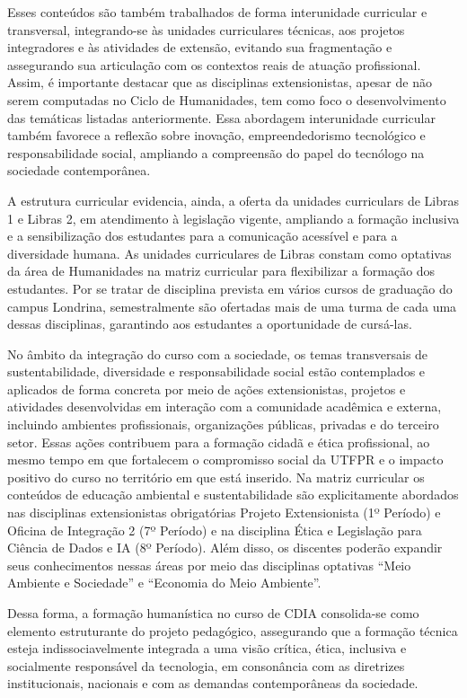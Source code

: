 Esses conteúdos são também trabalhados de forma interunidade curricular e transversal, integrando-se às unidades curriculares técnicas, aos projetos integradores e às atividades de extensão, evitando sua fragmentação e assegurando sua articulação com os contextos reais de atuação profissional. Assim, é importante destacar que as disciplinas extensionistas, apesar de não serem computadas no Ciclo de Humanidades, tem como foco o desenvolvimento das temáticas listadas anteriormente. Essa abordagem interunidade curricular também favorece a reflexão sobre inovação, empreendedorismo tecnológico e responsabilidade social, ampliando a compreensão do papel do tecnólogo na sociedade contemporânea.

A estrutura curricular evidencia, ainda, a oferta da unidades curriculars de Libras 1 e Libras 2, em atendimento à legislação vigente, ampliando a formação inclusiva e a sensibilização dos estudantes para a comunicação acessível e para a diversidade humana. As unidades curriculares de Libras constam como optativas da área de Humanidades na matriz curricular para flexibilizar a formação dos estudantes. Por se tratar de disciplina prevista em vários cursos de graduação do campus Londrina, semestralmente são ofertadas mais de uma turma de cada uma dessas disciplinas, garantindo aos estudantes a oportunidade de cursá-las.

No âmbito da integração do curso com a sociedade, os temas transversais de sustentabilidade, diversidade e responsabilidade social estão contemplados e aplicados de forma concreta por meio de ações extensionistas, projetos e atividades desenvolvidas em interação com a comunidade acadêmica e externa, incluindo ambientes profissionais, organizações públicas, privadas e do terceiro setor. Essas ações contribuem para a formação cidadã e ética profissional, ao mesmo tempo em que fortalecem o compromisso social da UTFPR e o impacto positivo do curso no território em que está inserido. Na matriz curricular os conteúdos de educação ambiental e sustentabilidade são explicitamente abordados nas disciplinas extensionistas obrigatórias Projeto Extensionista (1º Período) e Oficina de Integração 2 (7º Período) e na disciplina Ética e Legislação para Ciência de Dados e IA (8º Período). Além disso, os discentes poderão expandir seus conhecimentos nessas áreas por meio das disciplinas optativas “Meio Ambiente e Sociedade” e “Economia do Meio Ambiente”.

Dessa forma, a formação humanística no curso de CDIA consolida-se como elemento estruturante do projeto pedagógico, assegurando que a formação técnica esteja indissociavelmente integrada a uma visão crítica, ética, inclusiva e socialmente responsável da tecnologia, em consonância com as diretrizes institucionais, nacionais e com as demandas contemporâneas da sociedade.

